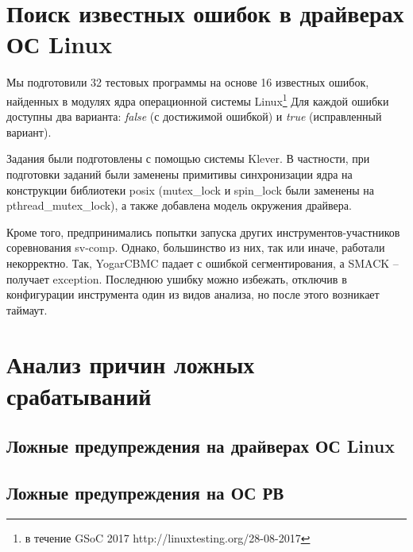 
\section{Поиск известных ошибок в драйверах ОС Linux}
Мы подготовили 32 тестовых программы на основе 16 известных ошибок, найденных в модулях ядра операционной системы Linux\footnote{в течение GSoC 2017 http://linuxtesting.org/28-08-2017}
Для каждой ошибки доступны два варианта: {\em false} (с достижимой ошибкой) и {\em true} (исправленный вариант).

Задания были подготовлены с помощью системы Klever. В частности, при подготовки заданий были заменены примитивы синхронизации ядра на конструкции библиотеки posix (mutex\_lock и spin\_lock были заменены на pthread\_mutex\_lock), а также добавлена модель окружения драйвера.

Кроме того, предпринимались попытки запуска других инструментов-участников соревнования sv-comp. 
Однако, большинство из них, так или иначе, работали некорректно. 
Так, YogarCBMC падает с ошибкой сегментирования, а SMACK -- получает exception. Последнюю ушибку можно избежать, отключив в конфигурации инструмента один из видов анализа, но после этого возникает таймаут.


\section{Анализ причин ложных срабатываний}

\subsection{Ложные предупреждения на драйверах ОС Linux}

\subsection{Ложные предупреждения на ОС РВ}






